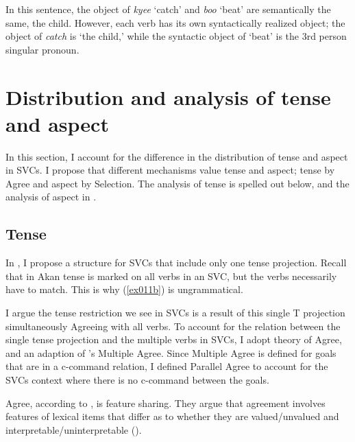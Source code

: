 \documentclass[output=paper,colorlinks,citecolor=brown]{langscibook}
\begin{document}
\z In this sentence, the object of \emph{kyee} `catch' and \emph{boo} `beat' are semantically the same, the child. However, each verb has its own syntactically realized object; the object of \emph{catch} is `the child,' while the syntactic object of `beat' is the 3rd person singular pronoun. 

 
\section{Distribution and analysis of tense and aspect}\label{sec:owusu:4}
In this section, I account for the difference in the distribution of tense and aspect in SVCs. I propose that different mechanisms value tense and aspect;   tense by {Agree}  and aspect by {Selection}. The analysis of tense is spelled out below, and the analysis of aspect in . 

\subsection{Tense}
In , I propose a structure for SVCs that include only one tense projection.  Recall that in Akan tense is marked on all verbs in an SVC, but the verbs necessarily have to match. This is why (\ref{ex011b}) is ungrammatical. 

\ea \label{ex011}
    
\z \z 
I argue the tense restriction we see in SVCs is a result of this single T projection simultaneously Agreeing with all verbs. To account for the relation between the single tense projection and the multiple verbs in SVCs, I adopt  theory of Agree, and an adaption of \citeauthor{Hiraiwa2001}'s \citeyearpar{Hiraiwa2001} Multiple Agree. Since Multiple Agree is defined for goals that are in a c-command relation, I defined  {Parallel Agree} to account for the SVCs context where there is no c-command between the goals.
 
Agree, according to \citet{PesetskyTorrego2007}, is feature sharing. They argue that agreement involves features of lexical items that differ as to whether they are valued/unvalued and interpretable\slash uninterpretable ().
  
\end{document}
